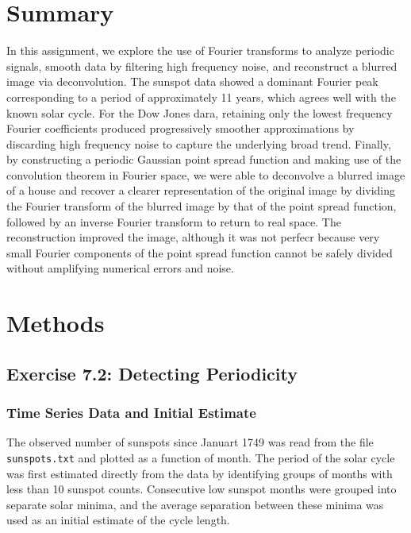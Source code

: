 \documentclass[a4paper,11pt]{article}
\begin{document}
\section*{Summary}

In this assignment, we explore the use of Fourier transforms to analyze periodic signals, smooth data by filtering high frequency noise, and reconstruct a blurred image via deconvolution. The sunspot data showed a dominant Fourier peak corresponding to a period of approximately 11 years, which agrees well with the known solar cycle. For the Dow Jones dara, retaining only the lowest frequency Fourier coefficients produced progressively smoother approximations by discarding high frequency noise to capture the underlying broad trend. Finally, by constructing a periodic Gaussian point spread function and making use of the convolution theorem in Fourier space, we were able to deconvolve a blurred image of a house and recover a clearer representation of the original image by dividing the Fourier transform of the blurred image by that of the point spread function, followed by an inverse Fourier transform to return to real space. The reconstruction improved the image, although it was not perfecr because very small Fourier components of the point spread function cannot be safely divided without amplifying numerical errors and noise. 


\section*{Methods}

\subsection*{Exercise 7.2: Detecting Periodicity}

\subsubsection*{Time Series Data and Initial Estimate}

The observed number of sunspots since Januart 1749 was read from the file \texttt{sunspots.txt} and plotted as a function of month. The period of the solar cycle was first estimated directly from the data by identifying groups of months with less than 10 sunspot counts. Consecutive low sunspot months were grouped into separate solar minima, and the average separation between these minima was used as an initial estimate of the cycle length.
\end{document}
